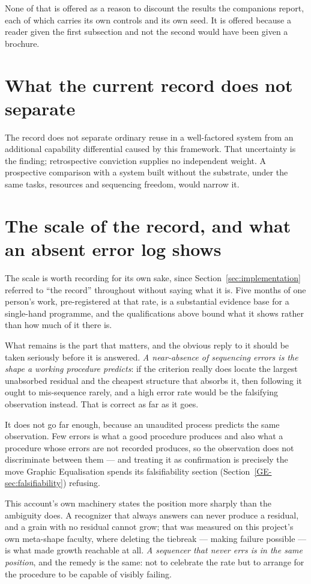 \documentclass[11pt,a4paper]{article}
\begin{document}
None of that is offered as a reason to discount the results the companions report, each of which
carries its own controls and its own seed. It is offered because a reader given the first subsection
and not the second would have been given a brochure.

\section{What the current record does not separate}\label{sec:estimate}
The record does not separate ordinary reuse in a well-factored system from an
additional capability differential caused by this framework. That uncertainty
is the finding; retrospective conviction supplies no independent weight.
A prospective comparison with a system built without the substrate, under
the same tasks, resources and sequencing freedom, would narrow it.

\section{The scale of the record, and what an absent error log shows}\label{sec:scale}

The scale is worth recording for its own sake, since Section~\ref{sec:implementation} referred to ``the record''
throughout without saying what it is. Five months of one person's work, pre-registered at that rate, is
a substantial evidence base for a single-hand programme, and the qualifications above bound what it
shows rather than how much of it there is.

What remains is the part that matters, and the obvious reply to it should be taken seriously before it
is answered. \emph{A near-absence of sequencing errors is the shape a working procedure predicts}: if
the criterion really does locate the largest unabsorbed residual and the cheapest structure that
absorbs it, then following it ought to mis-sequence rarely, and a high error rate would be the
falsifying observation instead. That is correct as far as it goes.

It does not go far enough, because an unaudited process predicts the same observation. Few errors is
what a good procedure produces and also what a procedure whose errors are not recorded produces, so
the observation does not discriminate between them --- and treating it as confirmation is precisely the
move Graphic Equalisation spends its falsifiability section (Section~\ref{GE-sec:falsifiability})
refusing.

This account's own machinery states the position more sharply than the ambiguity does. A recognizer
that always answers can never produce a residual, and a grain with no residual cannot grow; that was
measured on this project's own meta-shape faculty, where deleting the tiebreak --- making failure
possible --- is what made growth reachable at all. \emph{A sequencer that never errs is in the same
position}, and the remedy is the same: not to celebrate the rate but to arrange for the procedure to be
capable of visibly failing.
\end{document}
